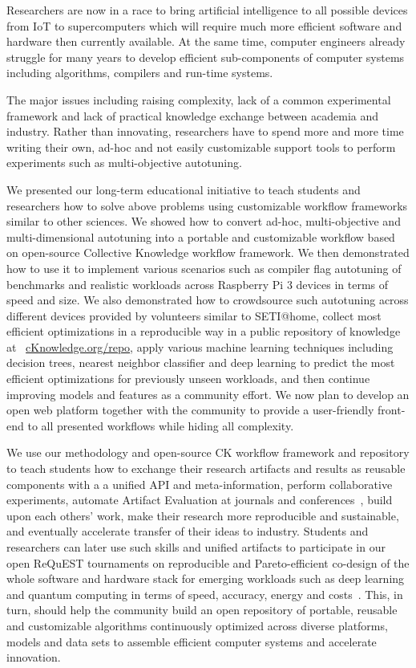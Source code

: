 Researchers are now in a race to bring artificial intelligence to all possible
devices from IoT to supercomputers which will require 
much more efficient software and hardware then currently available.
%
At the same time, computer engineers already struggle for many years 
to develop efficient sub-components of computer systems including
algorithms, compilers and run-time systems.

The major issues including raising complexity, lack of a common experimental framework 
and lack of practical knowledge exchange between academia and industry.
%
Rather than innovating, researchers have to spend more and more time 
writing their own, ad-hoc and not easily customizable support tools 
to perform experiments such as multi-objective autotuning.


We presented our long-term educational initiative to teach
students and researchers how to solve above problems 
using customizable workflow frameworks similar to other sciences.
%
We showed how to convert ad-hoc, multi-objective
and multi-dimensional autotuning into a portable and customizable workflow 
based on open-source Collective Knowledge workflow framework.
%
We then demonstrated how to use it to implement various scenarios
such as compiler flag autotuning of benchmarks and realistic workloads
across Raspberry Pi 3 devices in terms of speed and size.
%
We also demonstrated how to crowdsource such autotuning across different
devices provided by volunteers similar to SETI@home, collect most efficient optimizations
in a reproducible way in a public repository of knowledge at ~\href{http://cknowledge.org/repo}{cKnowledge.org/repo}, 
apply various machine learning techniques including decision trees, nearest neighbor classifier
and deep learning to predict the most efficient optimizations for previously
unseen workloads, and then continue improving models and features
as a community effort.
%
We now plan to develop an open web platform together with the community
to provide a user-friendly front-end to all presented workflows 
while hiding all complexity.

We use our methodology and open-source CK workflow framework and repository
to teach students how to exchange their research artifacts and results 
as reusable components with a a unified API and meta-information,
perform collaborative experiments, automate Artifact Evaluation
at journals and conferences~\cite{ctuning-ae1}, build upon each others' work,
make their research more reproducible and sustainable, 
and eventually accelerate transfer of their ideas to industry.
%
Students and researchers can later use such skills and unified artifacts
to participate in our open ReQuEST tournaments on reproducible and Pareto-efficient
co-design of the whole software and hardware stack for emerging workloads
such as deep learning and quantum computing in terms of
speed, accuracy, energy and costs~\cite{request}.
%
This, in turn, should help the community build an open repository of 
portable, reusable and customizable algorithms continuously optimized
across diverse platforms, models and data sets
to assemble efficient computer systems
and accelerate innovation.
